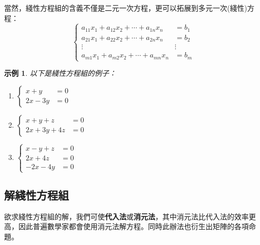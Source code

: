 \documentclass[12pt]{article}
\newtheorem*{example}{示例}
\begin{document}
    當然，綫性方程組的含義不僅是二元一次方程，更可以拓展到多元一次(綫性)方程：
    $$\begin{cases}
        a_{11}x_1+a_{12}x_2+\cdots+a_{1n}x_{n}&=b_1\\
        a_{21}x_1+a_{22}x_2+\cdots+a_{2n}x_{n}&=b_2\\
        \vdots&\vdots\\
        a_{m1}x_1+a_{m2}x_2+\cdots+a_{mn}x_{n}&=b_m
    \end{cases}$$

    \begin{example}
        以下是綫性方程組的例子：
        \begin{enumerate}
            \item $\begin{cases}
                x+y&=0\\
                2x-3y&=0
            \end{cases}$
            \item $\begin{cases}
                x+y+z&=0\\
                2x+3y+4z&=0
            \end{cases}$
            \item $\begin{cases}
                x-y+z&=0\\
                2x+4z&=0\\
                -2x-4y&=0
            \end{cases}$
        \end{enumerate}
    \end{example}

    \subsection*{解綫性方程組}

    欲求綫性方程組的解，我們可使\textbf{代入法}或\textbf{消元法}，其中消元法比代入法的效率更高，因此普遍數學家都會使用消元法解方程。同時此辦法也衍生出矩陣的各項命題。
\end{document}
